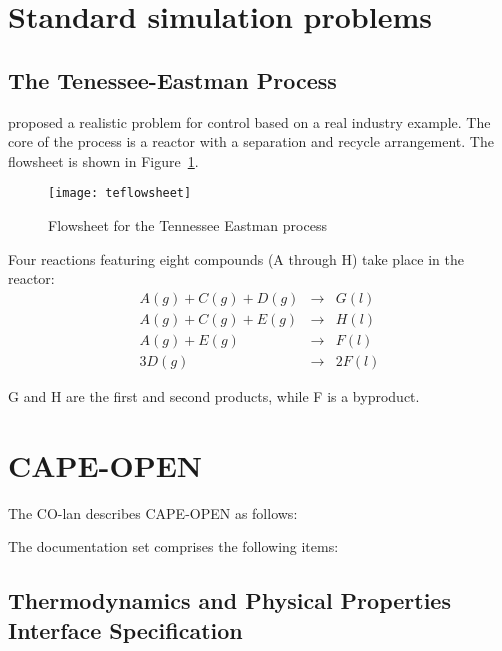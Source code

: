 \section{Standard simulation problems}

\subsection{The Tenessee-Eastman Process}
\label{sec:tenessee-eastman}
\citet{tenesseeeastman} proposed a realistic problem for control based
on a real industry example.  The core of the process is a reactor with
a separation and recycle arrangement.  The flowsheet is shown in
Figure~\ref{fig:teprocess}.
\begin{figure}[htbp]
  \centering
  \texttt{[image: teflowsheet]}
  \caption{Flowsheet for the Tennessee Eastman process~\citep{tenesseeeastman}}
  \label{fig:teprocess}
\end{figure}

Four reactions featuring eight compounds (A through H) take place in the reactor:
\begin{eqnarray}
A(g) + C(g) + D(g) & \rightarrow & G(l) \\
A(g) + C(g) + E(g) & \rightarrow & H(l) \\
A(g) + E(g)        & \rightarrow & F(l) \\
3D(g)              & \rightarrow & 2F(l) 
\label{eq:te-reaction}
\end{eqnarray}

G and H are the first and second products, while F is a byproduct.

\section{CAPE-OPEN}
The CO-lan describes CAPE-OPEN as follows:

The documentation set comprises the following items:
\subsection{Thermodynamics and Physical Properties Interface Specification}

